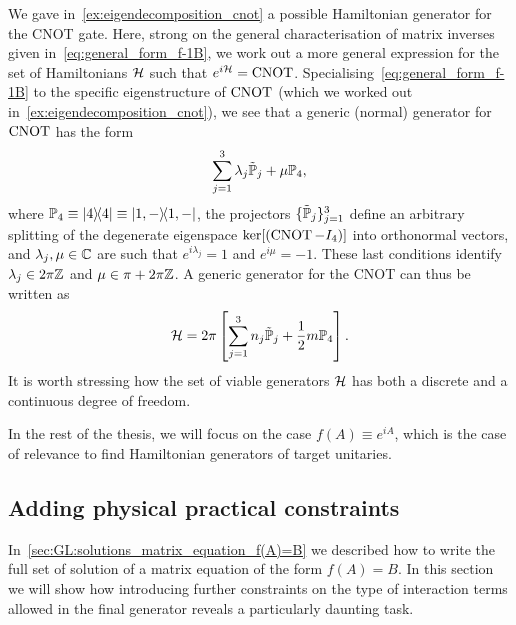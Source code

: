 \begin{example}[label={ex:cnot_generator_decomposition}]
We gave in~\cref{ex:eigendecomposition_cnot} a possible Hamiltonian generator for the CNOT gate.
Here, strong on the general characterisation of matrix inverses given in~\cref{eq:general_form_f-1B}, we work out a more general expression for the set of Hamiltonians ${\mathcal{H}}$ such that $e^{i{\mathcal{H}}}=\operatorname{CNOT}$.
Specialising~\cref{eq:general_form_f-1B} to the specific eigenstructure of $\operatorname{CNOT}$ (which we worked out in~\cref{ex:eigendecomposition_cnot}), we see that a generic (normal) generator for $\operatorname{CNOT}$ has the form
\begin{equation}
    \sum_{j=1}^3 \lambda_j \tilde{\mathbb{P}}_j + \mu\mathbb{P}_4,
\end{equation}
where
$\mathbb{P}_4\equiv\ketbra 4\equiv\ketbra{1,-}$, the projectors 
$\{\tilde{\mathbb{P}}_j\}_{j=1}^3$ define an arbitrary splitting of the degenerate eigenspace $\ker[(\operatorname{CNOT}-I_4)]$ into orthonormal vectors, and $\lambda_j,\mu\in\mathbb{C}$ are such that $e^{i\lambda_j}=1$ and $e^{i\mu}=-1$.
These last conditions identify $\lambda_j\in2\pi\mathbb{Z}$ and $\mu\in\pi + 2\pi\mathbb{Z}$.
A generic generator for the CNOT can thus be written as
\begin{equation}
    {\mathcal{H}} =
    2\pi\left[
    \sum_{j=1}^3 n_j \tilde{\mathbb{P}}_j +
    \frac{1}{2} m\mathbb{P}_4
    \right].
\end{equation}
It is worth stressing how the set of viable generators ${\mathcal{H}}$ has both a discrete and a continuous degree of freedom.
\end{example}

In the rest of the thesis, we will focus on the case $f(A)\equiv e^{iA}$, which is the case of relevance to find Hamiltonian generators of target unitaries.

\subsection{Adding physical practical constraints}
\label{sec:GL:constraints_on_interaction_pars}

In~\cref{sec:GL:solutions_matrix_equation_f(A)=B} we described how to write the full set of solution of a matrix equation of the form $f(A)=B$.
In this section we will show how introducing further constraints on the type of interaction terms allowed in the final generator reveals a particularly daunting task.

